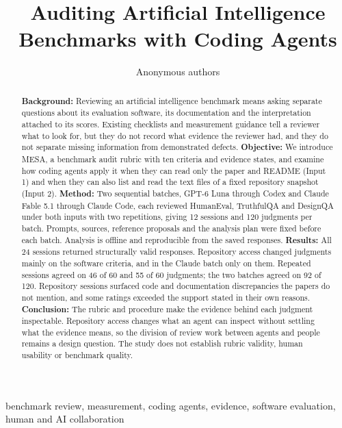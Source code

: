 \documentclass[10pt,conference]{IEEEtran}
\begin{document}
\title{Auditing Artificial Intelligence Benchmarks with Coding Agents}
\author{Anonymous authors}
\maketitle
\begin{abstract}
\textbf{Background:} Reviewing an artificial intelligence benchmark means asking separate questions about its evaluation software, its documentation and the interpretation attached to its scores. Existing checklists and measurement guidance tell a reviewer what to look for, but they do not record what evidence the reviewer had, and they do not separate missing information from demonstrated defects.
\textbf{Objective:} We introduce MESA, a benchmark audit rubric with ten criteria and evidence states, and examine how coding agents apply it when they can read only the paper and README (Input 1) and when they can also list and read the text files of a fixed repository snapshot (Input 2).
\textbf{Method:} Two sequential batches, GPT-6 Luna through Codex and Claude Fable 5.1 through Claude Code, each reviewed HumanEval, TruthfulQA and DesignQA under both inputs with two repetitions, giving 12 sessions and 120 judgments per batch. Prompts, sources, reference proposals and the analysis plan were fixed before each batch. Analysis is offline and reproducible from the saved responses.
\textbf{Results:} All 24 sessions returned structurally valid responses. Repository access changed judgments mainly on the software criteria, and in the Claude batch only on them. Repeated sessions agreed on 46 of 60 and 55 of 60 judgments; the two batches agreed on 92 of 120. Repository sessions surfaced code and documentation discrepancies the papers do not mention, and some ratings exceeded the support stated in their own reasons.
\textbf{Conclusion:} The rubric and procedure make the evidence behind each judgment inspectable. Repository access changes what an agent can inspect without settling what the evidence means, so the division of review work between agents and people remains a design question. The study does not establish rubric validity, human usability or benchmark quality.
\end{abstract}
\begin{IEEEkeywords}
benchmark review, measurement, coding agents, evidence, software evaluation, human and AI collaboration
\end{IEEEkeywords}
\end{document}
